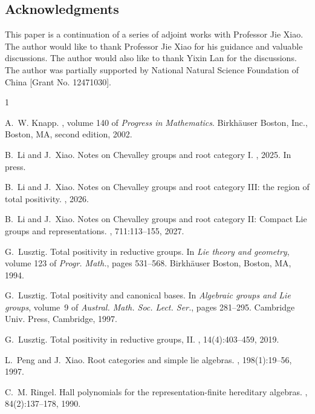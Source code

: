 \documentclass[12pt]{amsart}
\begin{document}
\subsection*{Acknowledgments}
This paper is a continuation of a series of adjoint works with Professor Jie Xiao. 
The author would like to thank Professor Jie Xiao for his guidance and valuable discussions.
The author would also like to thank Yixin Lan for the discussions.
The author was partially supported by National Natural Science Foundation of China [Grant No. 12471030].


\begin{thebibliography}{1}

A.~W. Knapp.
, volume 140 of {\em Progress
  in Mathematics}.
\newblock Birkh\"auser Boston, Inc., Boston, MA, second edition, 2002.

B.~Li and J.~Xiao.
\newblock Notes on {C}hevalley groups and root category {I}.
, 2025.
\newblock In press.

B.~Li and J.~Xiao.
\newblock Notes on {C}hevalley groups and root category {III}: the region of
  total positivity.
, 2026.

B.~Li and J.~Xiao.
\newblock Notes on {C}hevalley groups and root category {II}: Compact {L}ie
  groups and representations.
, 711:113--155, 2027.

G.~Lusztig.
\newblock Total positivity in reductive groups.
\newblock In {\em Lie theory and geometry}, volume 123 of {\em Progr. Math.},
  pages 531--568. Birkh\"auser Boston, Boston, MA, 1994.

G.~Lusztig.
\newblock Total positivity and canonical bases.
\newblock In {\em Algebraic groups and {L}ie groups}, volume~9 of {\em Austral.
  Math. Soc. Lect. Ser.}, pages 281--295. Cambridge Univ. Press, Cambridge,
  1997.

G.~Lusztig.
\newblock Total positivity in reductive groups, {II}.
, 14(4):403--459, 2019.

L.~Peng and J.~Xiao.
\newblock Root categories and simple lie algebras.
, 198(1):19--56, 1997.

C.~M. Ringel.
\newblock Hall polynomials for the representation-finite hereditary algebras.
, 84(2):137--178, 1990.

\end{thebibliography}
\end{document}
